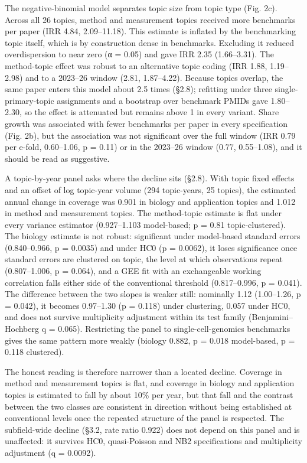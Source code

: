\documentclass{article}
\begin{document}
The negative-binomial model separates topic size from topic type (Fig.
2c). Across all 26 topics, method and measurement topics received more
benchmarks per paper (IRR 4.84, 2.09--11.18). This estimate is inflated
by the benchmarking topic itself, which is by construction dense in
benchmarks. Excluding it reduced overdispersion to near zero (α = 0.05)
and gave IRR 2.35 (1.66--3.31). The method-topic effect was robust to an
alternative topic coding (IRR 1.88, 1.19--2.98) and to a 2023--26 window
(2.81, 1.87--4.22). Because topics overlap, the same paper enters this
model about 2.5 times (§2.8); refitting under three single-primary-topic
assignments and a bootstrap over benchmark PMIDs gave 1.80--2.30, so the
effect is attenuated but remains above 1 in every variant. Share growth
was associated with fewer benchmarks per paper in every specification
(Fig. 2b), but the association was not significant over the full window
(IRR 0.79 per e-fold, 0.60--1.06, p = 0.11) or in the 2023--26 window
(0.77, 0.55--1.08), and it should be read as suggestive.

A topic-by-year panel asks where the decline sits (§2.8). With topic
fixed effects and an offset of log topic-year volume (294 topic-years,
25 topics), the estimated annual change in coverage was 0.901 in biology
and application topics and 1.012 in method and measurement topics. The
method-topic estimate is flat under every variance estimator
(0.927--1.103 model-based; p = 0.81 topic-clustered). The biology
estimate is not robust: significant under model-based standard errors
(0.840--0.966, p = 0.0035) and under HC0 (p = 0.0062), it loses
significance once standard errors are clustered on topic, the level at
which observations repeat (0.807--1.006, p = 0.064), and a GEE fit with
an exchangeable working correlation falls either side of the
conventional threshold (0.817--0.996, p = 0.041). The difference between
the two slopes is weaker still: nominally 1.12 (1.00--1.26, p = 0.042),
it becomes 0.97--1.30 (p = 0.118) under clustering, 0.057 under HC0, and
does not survive multiplicity adjustment within its test family
(Benjamini--Hochberg q = 0.065). Restricting the panel to
single-cell-genomics benchmarks gives the same pattern more weakly
(biology 0.882, p = 0.018 model-based, p = 0.118 clustered).

The honest reading is therefore narrower than a located decline.
Coverage in method and measurement topics is flat, and coverage in
biology and application topics is estimated to fall by about 10\% per
year, but that fall and the contrast between the two classes are
consistent in direction without being established at conventional levels
once the repeated structure of the panel is respected. The subfield-wide
decline (§3.2, rate ratio 0.922) does not depend on this panel and is
unaffected: it survives HC0, quasi-Poisson and NB2 specifications and
multiplicity adjustment (q = 0.0092).
\end{document}
